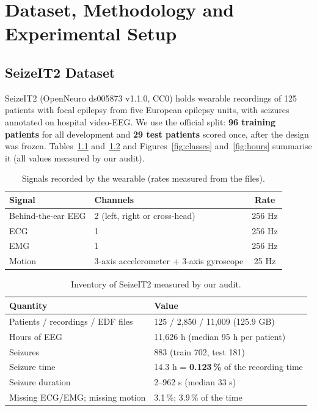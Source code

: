 \chapter{Dataset, Methodology and Experimental Setup}\label{ch:method}

\section{SeizeIT2 Dataset}

SeizeIT2 \cite{bhagubai2025seizeit2} (OpenNeuro ds005873 v1.1.0, CC0) holds wearable recordings of 125 patients with
focal epilepsy from five European epilepsy units, with seizures annotated on hospital video-EEG. We use the official
split: \textbf{96 training patients} for all development and \textbf{29 test patients} scored once, after the design
was frozen. Tables~\ref{tab:modalities} and~\ref{tab:inventory} and Figures~\ref{fig:classes} and~\ref{fig:hours}
summarise it (all values measured by our audit).

\begin{table}[H]
\centering\small
\caption{Signals recorded by the wearable (rates measured from the files).}\label{tab:modalities}
\begin{tabular}{@{}llc@{}}
\toprule
\textbf{Signal} & \textbf{Channels} & \textbf{Rate}\\
\midrule
Behind-the-ear EEG & 2 (left, right or cross-head) & 256 Hz\\
ECG & 1 & 256 Hz\\
EMG & 1 & 256 Hz\\
Motion & 3-axis accelerometer + 3-axis gyroscope & 25 Hz\\
\bottomrule
\end{tabular}
\end{table}

\begin{table}[H]
\centering\small
\caption{Inventory of SeizeIT2 measured by our audit.}\label{tab:inventory}
\begin{tabular}{@{}ll@{}}
\toprule
\textbf{Quantity} & \textbf{Value}\\
\midrule
Patients / recordings / EDF files & 125 / 2,850 / 11,009 (125.9 GB)\\
Hours of EEG & 11,626 h (median 95 h per patient)\\
Seizures & 883 (train 702, test 181)\\
Seizure time & 14.3 h = \textbf{0.123\,\%} of the recording time\\
Seizure duration & 2--962 s (median 33 s)\\
Missing ECG/EMG; missing motion & 3.1\,\%; 3.9\,\% of the time\\
\bottomrule
\end{tabular}
\end{table}

